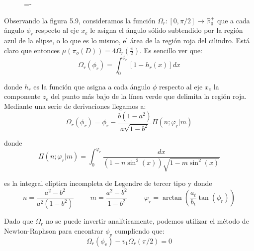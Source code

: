 \begin{figure}[h]
  \lineskip=-\fboxrule
\end{figure}

Observando la figura 5.9, consideramos la función $\Omega_r:[0,\pi /2]\rightarrow \mathds{R}_0^+$ que a cada ángulo $\phi_r$ respecto al eje $x_e$ le asigna el ángulo sólido subtendido por la región azul de la elipse, o lo que es lo mismo, el área de la región roja del cilindro. Está claro que entonces $\mu(\pi_o(D)) = 4\Omega_r(\frac{\pi}{2})$. Es sencillo ver que:
$$\Omega_r(\phi_r)=\int_0^{\phi_r}[1-h_r(x)] dx$$

donde $h_r$ es la función que asigna a cada ángulo $\phi$ respecto al eje $x_e$ la componente $z_e$ del punto más bajo de la línea verde que delimita la región roja. Mediante una serie de derivaciones llegamos a:
$$\Omega_r(\phi_r) = \phi_r -\frac{b(1-a^2)}{a\sqrt{1-b^2}}\Pi(n;\varphi_r|m) $$

donde
$$\Pi(n;\varphi_r|m) = \int_{0}^{\varphi_r}\frac{dx}{(1-n\sin^2(x))\sqrt{1-m\sin^2(x)}}$$

es la integral elíptica incompleta de Legendre de tercer tipo y donde
$$n = \frac{a^2-b^2}{a^2(1-b^2)}\hspace{1cm} m=\frac{a^2-b^2}{1-b^2} \hspace{1cm} \varphi_r=\arctan(\frac{a_t}{b_t}\tan(\phi_r))$$

Dado que $\Omega_r$ no se puede invertir analíticamente, podemos utilizar el método de Newton-Raphson para encontrar $\phi_v$ cumpliendo que:
$$\Omega_r(\phi_v)-v_1\Omega_r(\pi/2) = 0 $$


